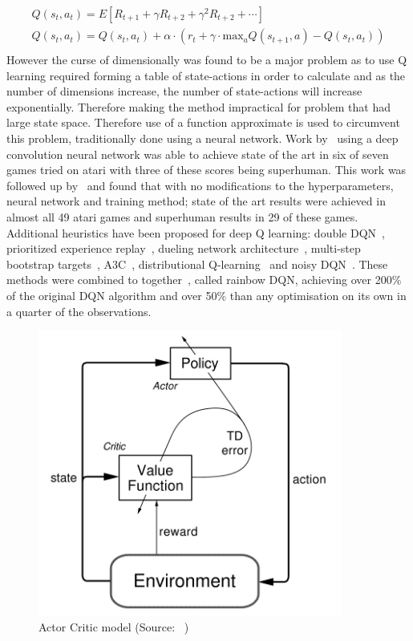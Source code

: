 \begin{align}
    Q(s_t, a_t) = E[R_{t+1} + \gamma R_{t+2} + \gamma^2 R_{t+2} + \cdots ] \label{eq:q_value} \\
    Q(s_t, a_t) = Q(s_t, a_t) + \alpha \cdot (r_t + \gamma \cdot \text{max}_a Q(s_{t+1} , a) - Q(s_t, a_t) ) \label{eq:q_learning} \\
\end{align}
However the curse of dimensionally was found to be a major problem as to use Q learning required
forming a table of state-actions in order to calculate and as the number of dimensions increase, the number of
state-actions will increase exponentially. Therefore making the method impractical for problem that had large state
space. Therefore use of a function approximate is used to circumvent this problem, traditionally done using a neural
network. Work by~\cite{atari} using a deep convolution neural network was able to achieve state of the art in six of seven
games tried on atari with three of these scores being superhuman. This work was followed up by~\cite{mnih2015humanlevel}
and found that with no modifications to the hyperparameters, neural network and training method; state of the art results were
achieved in almost all 49 atari games and superhuman results in 29 of these games. Additional heuristics have been
proposed for deep Q learning: double DQN~\citep{doubledqn}, prioritized experience replay~\citep{prioritizedexperiencereplay},
dueling network architecture~\citep{duelingdqn}, multi-step bootstrap targets~\citep{multi-step-dqn, Sutton1998},
A3C~\cite{A3C}, distributional Q-learning~\citep{distributional_dqn} and noisy DQN~\citep{noisy_dqn}. These methods were
combined to together~\cite{rainbow}, called rainbow DQN, achieving over 200\% of the original DQN algorithm and over
50\% than any optimisation on its own in a quarter of the observations.

\begin{figure}[h]
    \includegraphics[width=10cm]{figures/actor-critic.png}
    \caption{Actor Critic model (Source: ~\cite{Sutton1998})}
    \label{fig:actor-critic-model}
\end{figure}

